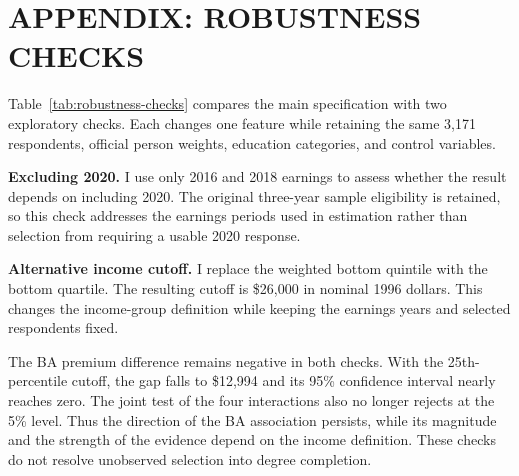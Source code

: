 \documentclass[12pt,letterpaper]{article}
\begin{document}
\clearpage
\appendix
\setcounter{table}{0}
\renewcommand{\thetable}{A\arabic{table}}
\renewcommand{\theHtable}{A\arabic{table}}
\section*{APPENDIX: ROBUSTNESS CHECKS}

Table~\ref{tab:robustness-checks} compares the main specification with two
exploratory checks. Each changes one feature while retaining the same 3,171
respondents, official person weights, education categories, and control variables.\newline

\textbf{Excluding 2020.} I use only 2016 and 2018 earnings to assess whether the
result depends on including 2020. The original three-year sample eligibility is
retained, so this check addresses the earnings periods used in estimation rather
than selection from requiring a usable 2020 response.\newline

\textbf{Alternative income cutoff.} I replace the weighted bottom quintile with
the bottom quartile. The resulting cutoff is \$26,000 in nominal 1996 dollars.
This changes the income-group definition while keeping the earnings years and
selected respondents fixed.


The BA premium difference remains negative in both checks. With the
25th-percentile cutoff, the gap falls to \$12,994 and its 95\% confidence interval
nearly reaches zero. The joint test of the four interactions also no longer
rejects at the 5\% level. Thus the direction of the BA association persists,
while its magnitude and the strength of the evidence depend on the income
definition. These checks do not resolve unobserved selection into degree completion.
\end{document}
